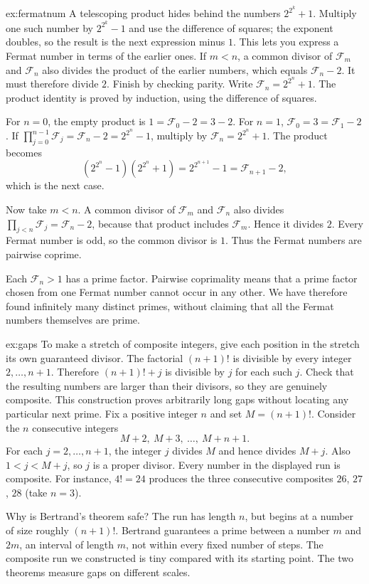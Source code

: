 \begin{solution}{ex:fermatnum}
\idea A telescoping product hides behind the numbers $2^{2^k}+1$. Multiply one such number by $2^{2^k}-1$ and use the difference of squares; the exponent doubles, so the result is the next expression minus $1$. This lets you express a Fermat number in terms of the earlier ones. If $m<n$, a common divisor of $\mathcal F_m$ and $\mathcal F_n$ also divides the product of the earlier numbers, which equals $\mathcal F_n-2$. It must therefore divide $2$. Finish by checking parity.
\writeup Write $\mathcal F_n=2^{2^n}+1$. The product identity is proved by induction, using the difference of squares.

For $n=0$, the empty product is $1=\mathcal F_0-2=3-2$. For $n=1$, $\mathcal F_0=3=\mathcal F_1-2$. If
$\prod_{j=0}^{n-1}\mathcal F_j=\mathcal F_n-2=2^{2^n}-1$, multiply by $\mathcal F_n=2^{2^n}+1$. The product becomes
\[
(2^{2^n}-1)(2^{2^n}+1)
=2^{2^{n+1}}-1=\mathcal F_{n+1}-2,
\]
which is the next case.

Now take $m<n$. A common divisor of $\mathcal F_m$ and $\mathcal F_n$ also divides $\prod_{j<n}\mathcal F_j=\mathcal F_n-2$, because that product includes $\mathcal F_m$. Hence it divides $2$. Every Fermat number is odd, so the common divisor is $1$. Thus the Fermat numbers are pairwise coprime.

Each $\mathcal F_n>1$ has a prime factor. Pairwise coprimality means that a prime factor chosen from one Fermat number cannot occur in any other. We have therefore found infinitely many distinct primes, without claiming that all the Fermat numbers themselves are prime.
\end{solution}

\begin{solution}{ex:gaps}
\idea To make a stretch of composite integers, give each position in the stretch its own guaranteed divisor. The factorial $(n+1)!$ is divisible by every integer $2,\ldots,n+1$. Therefore $(n+1)!+j$ is divisible by $j$ for each such $j$. Check that the resulting numbers are larger than their divisors, so they are genuinely composite. This construction proves arbitrarily long gaps without locating any particular next prime.
\writeup Fix a positive integer $n$ and set $M=(n+1)!$. Consider the $n$ consecutive integers
\[
M+2,\ M+3,\ \ldots,\ M+n+1.
\]
For each $j=2,\ldots,n+1$, the integer $j$ divides $M$ and hence divides $M+j$. Also $1<j<M+j$, so $j$ is a proper divisor. Every number in the displayed run is composite. For instance, $4!=24$ produces the three consecutive composites $26$, $27$, $28$ (take $n=3$).

Why is Bertrand's theorem safe? The run has length $n$, but begins at a number of size roughly $(n+1)!$. Bertrand guarantees a prime between a number $m$ and $2m$, an interval of length $m$, not within every fixed number of steps. The composite run we constructed is tiny compared with its starting point. The two theorems measure gaps on different scales.
\end{solution}

